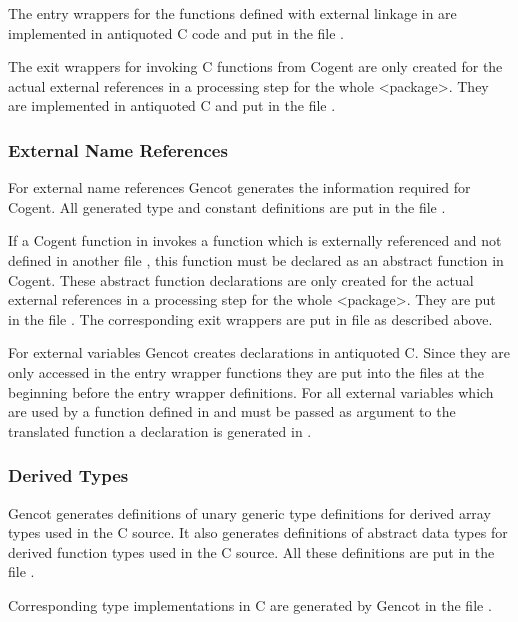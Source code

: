 The entry wrappers for the functions defined with external linkage in  are implemented in antiquoted C code and
put in the file . 

The exit wrappers for invoking C functions from Cogent are only created for the actual
external references in a processing step for the whole <package>. They are implemented in antiquoted C
and put in the file .

\subsubsection{External Name References}

For external name references Gencot generates the information required for Cogent. 
All generated type and constant definitions are put in the file .

If a Cogent function in  invokes a function which is externally referenced and not defined in another
file , this function must be declared as an abstract function in Cogent. These abstract function declarations
are only created for the actual
external references in a processing step for the whole <package>. They are put in the file .
The corresponding exit wrappers are put in file  as described above.

For external variables Gencot creates declarations in antiquoted C. Since they are only accessed in 
the entry wrapper functions they are put into the files  at the beginning before the entry wrapper 
definitions. For all
external variables which are used by a function defined in  and must be passed as argument to the 
translated function a declaration is generated in .

\subsubsection{Derived Types}

Gencot generates definitions of unary generic type definitions for derived array types 
used in the C source. It also generates definitions of abstract data types for derived function types 
used in the C source. All these definitions are put in the file .

Corresponding type implementations in C are generated by Gencot in the file .

